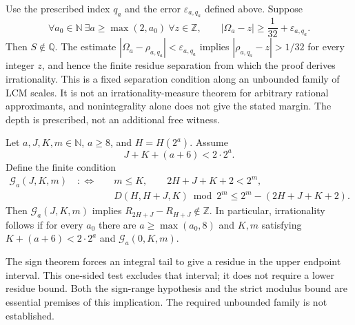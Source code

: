 \begin{prop}\label{prop:SEP-03}
Use the prescribed index $q_a$ and the error
$\varepsilon_{a,q_a}$ defined above. Suppose
\[
 \forall a_0\in\mathbb N\ \exists a\ge\max(2,a_0)\ \forall z\in\mathbb Z,
 \qquad |\Omega_a-z|\ge\frac1{32}+\varepsilon_{a,q_a}.
\]
Then $S\notin\mathbb Q$. The estimate
$|\Omega_a-\rho_{a,q_a}|<\varepsilon_{a,q_a}$ implies
$|\rho_{a,q_a}-z|>1/32$ for every integer $z$, and hence the finite
residue separation from which the proof derives irrationality.
This is a fixed separation condition along an unbounded family of LCM
scales. It is not an irrationality-measure theorem for arbitrary
rational approximants, and nonintegrality alone does not give the
stated margin. The depth is prescribed, not an additional free witness.

\end{prop}

\begin{prop}\label{prop:TE-04}
Let $a,J,K,m\in\mathbb N$, $a\ge8$, and $H=H(2^a)$. Assume
\[
 J+K+(a+6)<2\cdot2^a.
\]
Define the finite condition
\[
 \begin{aligned}
 \mathcal G_a(J,K,m)\quad:\Longleftrightarrow\quad
 &m\le K,\qquad 2H+J+K+2<2^m,\\
 &D(H,H+J,K)\bmod2^m\le2^m-(2H+J+K+2).
 \end{aligned}
\]
Then $\mathcal G_a(J,K,m)$ implies $R_{2H+J}-R_{H+J}\notin\mathbb Z$.
In particular, irrationality follows if for every $a_0$ there are
$a\ge\max(a_0,8)$ and $K,m$ satisfying $K+(a+6)<2\cdot2^a$ and
$\mathcal G_a(0,K,m)$.

The sign theorem forces an integral tail to give a residue in the upper
endpoint interval. This one-sided test excludes that interval; it does
not require a lower residue bound. Both the sign-range hypothesis and
the strict modulus bound are essential premises of this implication.
The required unbounded family is not established.
\end{prop}

